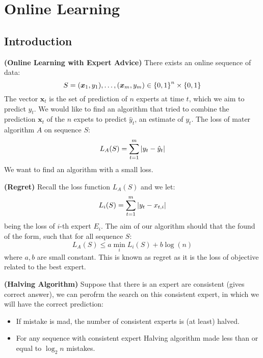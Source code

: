 \section{Online Learning}

\subsection{Introduction}

\begin{definition}{\textbf{(Online Learning with Expert Advice)}}
    There exists an online sequence of data:
    \begin{equation*}
        S = (\boldsymbol x_1, y_1),\dots, (\boldsymbol x_m, y_m) \in \left\{ 0, 1 \right\}^n \times \left\{ 0, 1 \right\}
    \end{equation*} 
    The vector $\boldsymbol x_t$ is the set of prediction of $n$ experts at time $t$, which we aim to predict $y_t$. We would like to find an algorithm that tried to combine the prediction $\boldsymbol x_t$ of the $n$ expets to predict $\hat{y}_t$, an estimate of $y_t$. The loss of mater algorithm $A$ on sequence $S$:
    \begin{equation*}
        L_A(S) = \sum^m_{t=1}\left| y_t - \hat{y}_t \right|
    \end{equation*}
    We want to find an algorithm with a small loss.
\end{definition}

\begin{definition}{\textbf{(Regret)}}
    Recall the loss function $L_A(S)$ and we let:
    \begin{equation*}
        L_i(S) = \sum^m_{t=1} \left| y_t - x_{t, i} \right|
    \end{equation*}
    being the loss of $i$-th expert $E_i$. The aim of our algorithm should that the found of the form, such that for all sequence $S$:
    \begin{equation*}
        L_A(S) \le a \min_{i}L_i(S) + b\log(n)
    \end{equation*}
    where $a, b$ are small constant. This is known as regret as it is the loss of objective related to the best expert. 
\end{definition}

\begin{definition}{\textbf{(Halving Algorithm)}}
    Suppose that there is an expert are consistent (gives correct answer), we can perofrm the search on this consistent expert, in which we will have the correct prediction:
    \begin{itemize}
        \item If mistake is mad, the number of consistent experts is (at least) halved. 
        \item For any sequence with consistent expert Halving algorithm made less than or equal to $\log_2n$ mistakes. 
    \end{itemize}
\end{definition}

